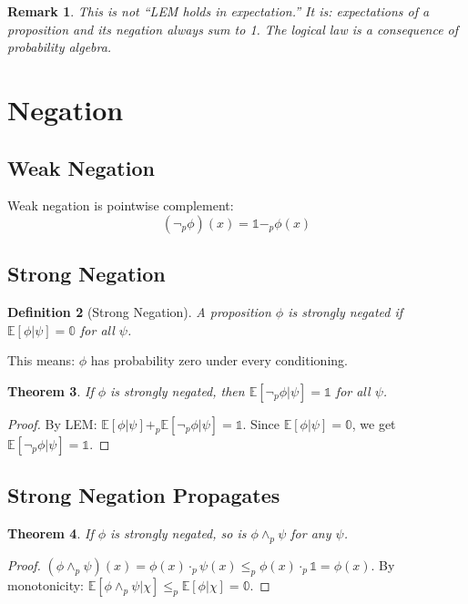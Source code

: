 \documentclass[11pt,a4paper]{article}
\newtheorem{theorem}{Theorem}[section]
\newtheorem{definition}[theorem]{Definition}
\newtheorem{remark}[theorem]{Remark}
\newcommand{\E}{\mathbb{E}}
\newcommand{\pand}{\wedge_p}
\newcommand{\pnot}{\neg_p}
\newcommand{\pzero}{\mathbb{0}}
\newcommand{\pone}{\mathbb{1}}
\newcommand{\ple}{\leq_p}
\newcommand{\padd}{+_p}
\newcommand{\pmul}{\cdot_p}
\newcommand{\psub}{-_p}
\begin{document}
\begin{remark}
This is not ``LEM holds in expectation.'' It is: expectations of a proposition and its negation always sum to 1. The logical law is a consequence of probability algebra.
\end{remark}

\section{Negation}

\subsection{Weak Negation}

Weak negation is pointwise complement:
\[
(\pnot\phi)(x) = \pone \psub \phi(x)
\]

\subsection{Strong Negation}

\begin{definition}[Strong Negation]
A proposition $\phi$ is \emph{strongly negated} if $\E[\phi|\psi] = \pzero$ for all $\psi$.
\end{definition}

This means: $\phi$ has probability zero under every conditioning.

\begin{theorem}
If $\phi$ is strongly negated, then $\E[\pnot\phi|\psi] = \pone$ for all $\psi$.
\end{theorem}

\begin{proof}
By LEM: $\E[\phi|\psi] \padd \E[\pnot\phi|\psi] = \pone$. Since $\E[\phi|\psi] = \pzero$, we get $\E[\pnot\phi|\psi] = \pone$.
\end{proof}

\subsection{Strong Negation Propagates}

\begin{theorem}
If $\phi$ is strongly negated, so is $\phi \pand \psi$ for any $\psi$.
\end{theorem}

\begin{proof}
$(\phi \pand \psi)(x) = \phi(x) \pmul \psi(x) \ple \phi(x) \pmul \pone = \phi(x)$.
By monotonicity: $\E[\phi \pand \psi|\chi] \ple \E[\phi|\chi] = \pzero$.
\end{proof}
\end{document}
